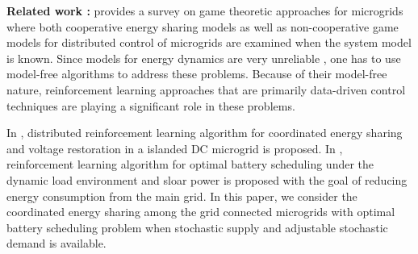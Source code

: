 \textbf{Related work :} \cite{saad2012game} provides a survey on game theoretic approaches for microgrids where both cooperative energy sharing models as well as non-cooperative game models for distributed control of microgrids are examined when the system model is known. Since  models for energy dynamics are very unreliable \cite{zamora2010controls}, one has to use model-free algorithms to address these problems.  Because of their model-free nature, reinforcement learning \cite{sutton1998reinforcement} approaches that are primarily data-driven control techniques are playing a significant role in these problems.

In \cite{zifadistributed}, distributed reinforcement learning algorithm for coordinated energy sharing and voltage restoration in a islanded DC microgrid is proposed. In \cite{leo2014reinforcement}, reinforcement learning algorithm for optimal battery scheduling under the dynamic load environment and sloar power is proposed with the goal of  reducing  energy consumption from the main grid. In this paper, we  consider the coordinated energy sharing among the grid connected microgrids with optimal battery scheduling problem when stochastic supply and adjustable stochastic demand is available.



 







%

